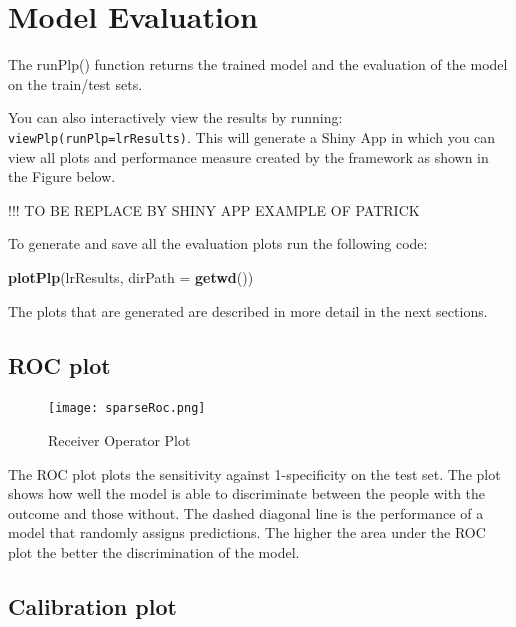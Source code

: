 \documentclass[]{article}
\newenvironment{Shaded}{\begin{snugshade}}{\end{snugshade}}
\newcommand{\KeywordTok}[1]{\textcolor[rgb]{0.13,0.29,0.53}{\textbf{#1}}}
\newcommand{\DataTypeTok}[1]{\textcolor[rgb]{0.13,0.29,0.53}{#1}}
\newcommand{\NormalTok}[1]{#1}
\begin{document}
\newpage

\section{Model Evaluation}\label{model-evaluation}

The runPlp() function returns the trained model and the evaluation of
the model on the train/test sets.

You can also interactively view the results by running:
\texttt{viewPlp(runPlp=lrResults)}. This will generate a Shiny App in
which you can view all plots and performance measure created by the
framework as shown in the Figure below.

!!! TO BE REPLACE BY SHINY APP EXAMPLE OF PATRICK

To generate and save all the evaluation plots run the following code:

\begin{Shaded}
\begin{Highlighting}[]
\KeywordTok{plotPlp}\NormalTok{(lrResults, }\DataTypeTok{dirPath =} \KeywordTok{getwd}\NormalTok{())}
\end{Highlighting}
\end{Shaded}

The plots that are generated are described in more detail in the next
sections.

\newpage

\subsection{ROC plot}\label{roc-plot}

\begin{figure}
\centering
\texttt{[image: sparseRoc.png]}
\caption{Receiver Operator Plot}
\end{figure}

The ROC plot plots the sensitivity against 1-specificity on the test
set. The plot shows how well the model is able to discriminate between
the people with the outcome and those without. The dashed diagonal line
is the performance of a model that randomly assigns predictions. The
higher the area under the ROC plot the better the discrimination of the
model.

\newpage

\subsection{Calibration plot}\label{calibration-plot}
\end{document}
